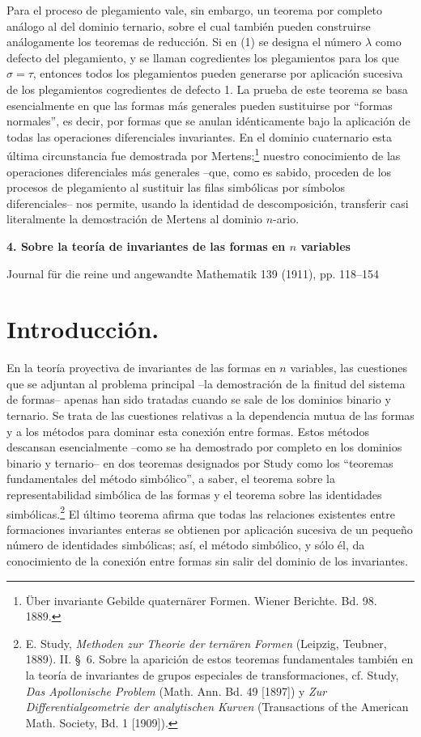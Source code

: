 \documentclass[11pt]{article}
\begin{document}
Para el proceso de plegamiento vale, sin embargo, un teorema por completo análogo al del dominio ternario, sobre el cual también pueden construirse análogamente los teoremas de reducción. Si en (1) se designa el número $\lambda$ como defecto del plegamiento, y se llaman cogredientes los plegamientos para los que $\sigma=\tau$, entonces todos los plegamientos pueden generarse por aplicación sucesiva de los plegamientos cogredientes de defecto 1. La prueba de este teorema se basa esencialmente en que las formas más generales pueden sustituirse por ``formas normales'', es decir, por formas que se anulan idénticamente bajo la aplicación de todas las operaciones diferenciales invariantes. En el dominio cuaternario esta última circunstancia fue demostrada por Mertens;\footnote{Über invariante Gebilde quaternärer Formen. Wiener Berichte. Bd. 98. 1889.} nuestro conocimiento de las operaciones diferenciales más generales --que, como es sabido, proceden de los procesos de plegamiento al sustituir las filas simbólicas por símbolos diferenciales-- nos permite, usando la identidad de descomposición, transferir casi literalmente la demostración de Mertens al dominio $n$-ario.

\clearpage
\begin{center}
{\Large\bfseries 4. Sobre la teoría de invariantes de las formas en $n$ variables}\par
\vspace{1.2em}
Journal für die reine und angewandte Mathematik 139 (1911), pp. 118--154
\end{center}

\section*{Introducción.}
En la teoría proyectiva de invariantes de las formas en $n$ variables, las cuestiones que se adjuntan al problema principal --la demostración de la finitud del sistema de formas-- apenas han sido tratadas cuando se sale de los dominios binario y ternario. Se trata de las cuestiones relativas a la dependencia mutua de las formas y a los métodos para dominar esta conexión entre formas. Estos métodos descansan esencialmente --como se ha demostrado por completo en los dominios binario y ternario-- en dos teoremas designados por Study como los ``teoremas fundamentales del método simbólico'', a saber, el teorema sobre la representabilidad simbólica de las formas y el teorema sobre las identidades simbólicas.\footnote{E. Study, \emph{Methoden zur Theorie der ternären Formen} (Leipzig, Teubner, 1889). II. \S\ 6. Sobre la aparición de estos teoremas fundamentales también en la teoría de invariantes de grupos especiales de transformaciones, cf. Study, \emph{Das Apollonische Problem} (Math. Ann. Bd. 49 [1897]) y \emph{Zur Differentialgeometrie der analytischen Kurven} (Transactions of the American Math. Society, Bd. 1 [1909]).} El último teorema afirma que todas las relaciones existentes entre formaciones invariantes enteras se obtienen por aplicación sucesiva de un pequeño número de identidades simbólicas; así, el método simbólico, y sólo él, da conocimiento de la conexión entre formas sin salir del dominio de los invariantes.
\end{document}
